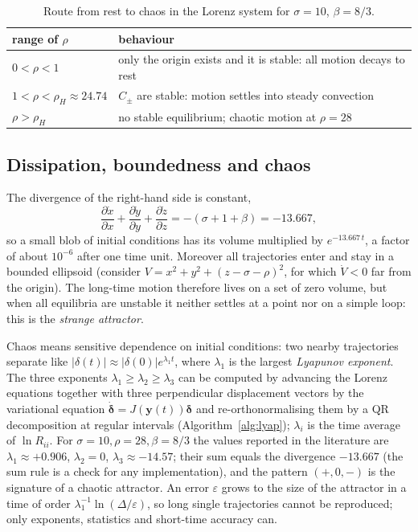 \documentclass[11pt,a4paper]{article}
\newcommand{\bfy}{\mathbf{y}}
\begin{document}
\begin{table}[H]
\centering
\begin{tabular}{@{}ll@{}}
\toprule
range of $\rho$ & behaviour\\
\midrule
$0<\rho<1$ & only the origin exists and it is stable: all motion decays to rest\\
$1<\rho<\rho_H\approx24.74$ & $C_\pm$ are stable: motion settles into steady convection\\
$\rho>\rho_H$ & no stable equilibrium; chaotic motion at $\rho=28$\\
\bottomrule
\end{tabular}
\caption{Route from rest to chaos in the Lorenz system for $\sigma=10$, $\beta=8/3$.}
\label{tab:route}
\end{table}

\subsection{Dissipation, boundedness and chaos}

The divergence of the right-hand side is constant,
\begin{equation}
\frac{\partial\dot x}{\partial x}+\frac{\partial\dot y}{\partial y}+\frac{\partial\dot z}{\partial z}
=-(\sigma+1+\beta)=-13.667,
\end{equation}
so a small blob of initial conditions has its volume multiplied by $e^{-13.667\,t}$, a factor of about
$10^{-6}$ after one time unit. Moreover all trajectories enter and stay in a bounded ellipsoid
(consider $V=x^2+y^2+(z-\sigma-\rho)^2$, for which $\dot V<0$ far from the origin). The long-time motion
therefore lives on a set of zero volume, but when all equilibria are unstable it neither settles at a
point nor on a simple loop: this is the \emph{strange attractor}.

Chaos means sensitive dependence on initial conditions: two nearby trajectories separate like
$|\delta(t)|\approx|\delta(0)|e^{\lambda_1t}$, where $\lambda_1$ is the largest \emph{Lyapunov exponent}.
The three exponents $\lambda_1\ge\lambda_2\ge\lambda_3$ can be computed by advancing the Lorenz
equations together with three perpendicular displacement vectors by the variational equation
$\dot{\boldsymbol\delta}=J(\bfy(t))\boldsymbol\delta$ and re-orthonormalising them by a QR
decomposition at regular intervals (Algorithm~\ref{alg:lyap}); $\lambda_i$ is the time average of
$\ln R_{ii}$. For $\sigma=10,\rho=28,\beta=8/3$ the values reported in the literature are
$\lambda_1\approx+0.906$, $\lambda_2=0$, $\lambda_3\approx-14.57$; their sum equals the divergence
$-13.667$ (the sum rule is a check for any implementation), and the pattern $(+,0,-)$ is the signature
of a chaotic attractor. An error $\varepsilon$ grows to the size of the attractor in a time of order
$\lambda_1^{-1}\ln(\Delta/\varepsilon)$, so long single trajectories cannot be reproduced; only
exponents, statistics and short-time accuracy can.
\end{document}

